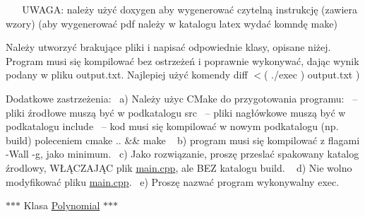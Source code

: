 ~\newline
~\newline
 U\+W\+A\+GA\+: należy użyć doxygen aby wygenerować czytelną instrukcję (zawiera wzory) (aby wygenerować pdf należy w katalogu latex wydać komndę \textquotesingle{}make\textquotesingle{})~\newline


Należy utworzyć brakujące pliki i napisać odpowiednie klasy, opisane niżej. Program musi się kompilować bez ostrzeżeń i poprawnie wykonywać, dając wynik podany w pliku output.\+txt. Najlepiej użyć komendy \textquotesingle{}diff $<$( ./exec ) output.\+txt )\textquotesingle{}

Dodatkowe zastrzeżenia\+:~\newline
a) Należy użyc C\+Make do przygotowania programu\+:~\newline
 -- pliki źrodłowe muszą być w podkatalogu \textquotesingle{}src\textquotesingle{}~\newline
 -- pliki nagłówkowe muszą być w podkatalogu \textquotesingle{}include\textquotesingle{}~\newline
 -- kod musi się kompilować w nowym podkatalogu (np. \textquotesingle{}build\textquotesingle{}) poleceniem \textquotesingle{}cmake .. \&\& make\textquotesingle{} ~\newline
b) program musi się kompilować z flagami \textquotesingle{}-\/\+Wall -\/g\textquotesingle{}, jako minimum.~\newline
c) Jako rozwiązanie, proszę przeslać spakowany katalog źrodlowy, WŁĄ\+C\+Z\+A\+JĄC plik \hyperlink{main_8cpp}{main.\+cpp}, ale B\+EZ katalogu \textquotesingle{}build\textquotesingle{}. ~\newline
d) Nie wolno modyfikować pliku \hyperlink{main_8cpp}{main.\+cpp}.~\newline
e) Proszę nazwać program wykonywalny \textquotesingle{}exec\textquotesingle{}.~\newline






$\ast$$\ast$$\ast$ Klasa \hyperlink{classPolynomial}{Polynomial} $\ast$$\ast$$\ast$

